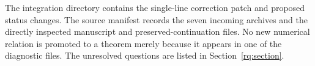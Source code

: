 The integration directory contains the single-line correction patch and
proposed status changes. The source manifest records the seven incoming
archives and the directly inspected manuscript and preserved-continuation
files. No new numerical relation is promoted to a theorem merely because
it appears in one of the diagnostic files. The unresolved questions are
listed in Section~\ref{rq:section}.
